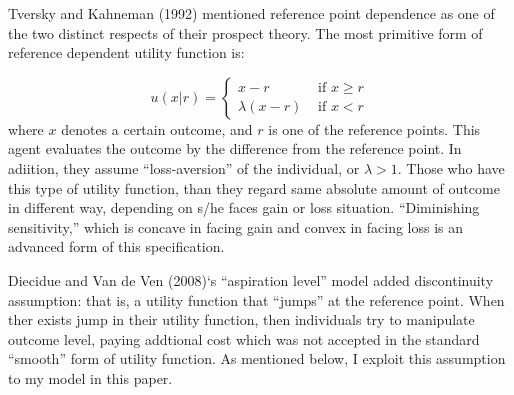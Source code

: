 \documentclass[dvipdfmx, 12pt]{article}
\begin{document}
  Tversky and Kahneman (1992) mentioned reference point dependence as one of the two distinct respects of their prospect theory. The most primitive form of reference dependent utility function is:

   \[
  u(x | r) = \begin{cases}
  x - r & \text{ if }x \geq r \\
  \lambda (x - r) & \text{ if }x < r
\end{cases}
  \]
  where $x$ denotes a certain outcome, and $r$ is one of the reference points. This agent evaluates the outcome by the difference from the reference point. In adiition, they assume ``loss-aversion'' of the individual, or $\lambda > 1$. Those who have this type of utility function, than they regard same absolute amount of outcome in different way, depending on s/he faces gain or loss situation. ``Diminishing sensitivity,'' which is concave in facing gain and convex in facing loss is an advanced form of this specification.

  Diecidue and Van de Ven (2008)`s ``aspiration level'' model added discontinuity assumption: that is, a utility function that ``jumps'' at the reference point. When ther exists jump in their utility function, then individuals try to manipulate outcome level, paying addtional cost which was not accepted in the standard ``smooth'' form of utility function. As mentioned below, I exploit this assumption to my model in this paper.
\end{document}
